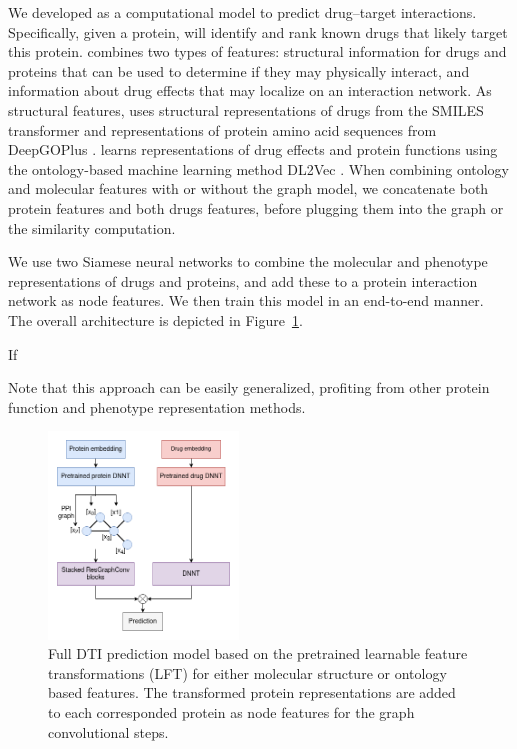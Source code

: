 \documentclass{bioinfo}
\renewcommand{\cite}{\citep}
\begin{document}
We developed \name as a computational model to predict drug--target
interactions. Specifically, given a protein, \name will identify and
rank known drugs that likely target this protein. \name combines two 
types of features: structural information for drugs and proteins that
can be used to determine if they may physically interact, and
information about drug effects that may localize on an interaction
network.
As structural features, \name uses structural representations of drugs
from the SMILES transformer \cite{SmilesTransformer} and representations of protein
amino acid sequences from DeepGOPlus \cite{DeepGoPlus}.
\name learns representations of drug effects and protein functions
using the ontology-based machine learning method DL2Vec \cite{DL2vec2020}.
When combining ontology and molecular features with or without the graph model, we concatenate both protein features and both drugs features, before plugging them into the graph or the similarity computation. 

We use two Siamese neural networks to combine the molecular
and phenotype representations of drugs and proteins,
and add these to a protein interaction network as node features.
We then train this model in an end-to-end manner. %
The overall architecture is depicted in Figure~\ref{fig:Fullmodel}.


If 



Note that this approach can be easily generalized, profiting from
other protein function and phenotype representation methods.


\begin{figure}[!tpb]
	\centerline{\includegraphics[width=0.45\textwidth]{figures/full_model.png}}
	\caption{Full DTI prediction model based on the pretrained learnable feature transformations (LFT) for either molecular structure or ontology based features. The transformed protein representations are added to each corresponded protein as node features for the graph convolutional steps. }
	\label{fig:Fullmodel}
\end{figure}
\end{document}
